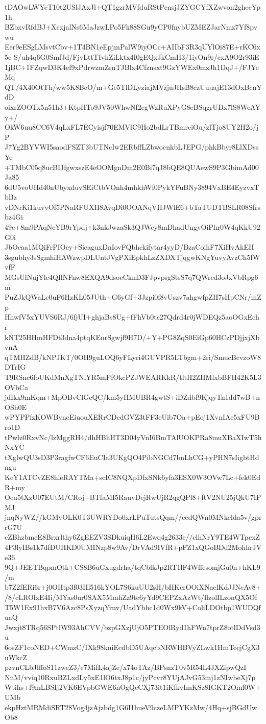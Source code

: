 tDAOwLWYcT10t2USlJAxJl+QT1gzrMVfduRStPcnsjJZYGCYfXZwvon2gheeYp1h
BZbxvRfdBJ+XcxjalNs6MaJzwLPo5Fk88SGu9yCP0fnybUZMEZJarNmz7Yf8pvwu
Eer9eESgLMsvtCbv+1T4BN1eEpjmPalW9iyOCc+AIIbF3R3qUYlOi87E+rKC6x5e
S/uh4q6G0SmfJd/FjvLttTIvhZiLktx4I0gEQxJkCmH3/1iyOn9r/cxA9O2r93iE
1jBC+1FZqwD3K4ef9xPdrwzmZrnTJBlx4Cfznsxt9GzYWEx0mzJh1DqJ+/FJYeMq
QT/4X40OtTh/ww5K8BcO/m+Ge5TlDLyziajMVzjuJHsB8czUuuajE13dOxBcnYdD
oixrZOOTx5n51h3+KtpHTo9JV50WhwNf2egWzRuXPyG8eBSqgrUDx7lS8WcAYy+/
OkW6uu8CC6V4qLxFL7ECyisjf70EMVlC9Ho2bdLrTBmreiOu/zlTjo8UY2H2o/jP
J7Yg2BYVWI5saodFSZT3bUTNcIw2ERbffLZbwocnkbLJEPG/phkBbyr8LlXDssYe
+TMbC05q8ucBIJfgwxszE4eOOMgnDm2E0Bi7qJ8bQE8QUAewS9P3GbimAd00Ja85
6dU5voUHd40nUbyxduvSEiCtbVOnh4mhkhWf0PykYFuBNy3894VxBE4EyzvxTbBz
vDNrKi1kuvvOf5PNaRFUXH8AvqDi0OOANqVHJWlE6+bTaTUDTBSLR08Sfrsbz4Gi
49e+8m9PAqNcYB9rYpdj+k3nkJwzaSk3QJWcy8mDhadUngyOiPhr0W4qKkU92G0i
JbOeaa1MQiFrPIOey+SieaguxDnIovFQbhckifytar4yyD/BzaCoihF7XiHvAkEH
3sgubhy3sSgmhiHAWzwpDLUntJVgPXiEpkhLzZXDXTjqgwKNgYuvyAvzCh5fWvfF
MGsUlNujYlc4QIlNFnw8EXQA9dsocCknD3FJpvpsgStsS7q7QWrcd3oJxVbRpg6m
PuZJkQWaLe0uF6HzKL05JUth+G6yGf+3Jzpi0f8vUszv7ahgwfpZH7sHpCNr/mZp
HhwfV5xYUVS6RJ/6fjUI+ghjaBs8Ug+fFhVb0tc27Qdrd4r0jWDEQz5aoOGxEchr
kNT25HHmHFDt3dna4ptqKEnrSgwjf9H7D/+Y+PG8ZqS0EiGp60HCzPDjjxjXbvnA
qTMHZdB/kNPJKT/0OH9guLOQ6yFLyri4GUVPR5LTbgm+2ri/SmucBcvzoW8DTrIG
T9RSnc6foUKdMnXgTNlYR5mPfOkcPZJWEARKkR/tltH2ZHMlxbBFH42K5L3OVbCa
jdIkx9mKqm+MpOBvClGcQC/km5yHMUBR4gwtS+iDZdbf9KjqyTn1dd7wB+nOSh0E
wPYPPfzKOWByncEiuouXERrCDcdGVZ3tFF3eUib7Oa+pEoj1XvnIAe5xFU9Bro1D
tPwlz0RxvNc/lzMggRH4/dhHBhHT3D04yVnI6BmTAlUOKPRa8muXBaXIwT5hNxYC
tXglwQU3sD3P3ragfwCF6EuCIa3UKgQO4PibNGCd7bnLhCG+yPHN7sIigbtHdngu
KeY1ATCvZE8hleRAYTMa+scIC8NQXpDfxSNk6yfa3ESX0W3OVw7Lc+fek0EdR+my
Oeu5tXzU07EUtM/CRoj+BTfaMI5RauvDejRwUjR2qgQPl8+ftV2NU25jQkU7IPMJ
jnqNyWZ//kGMvOLK0T3UWRYDo0xrLPuTutsQqm//cedQWn0MNkelda5v/gprrG7U
cZBhzbmeE8Brxrlthy6ZgEEZV3SDkuiqH6L2Ewq4g2633e//clhNrY9TE4WTpexZ
4P3lyIBs1k7dfDUHKD0UMINzp8w9Av/DrVAd9IVfR+pFZ1xQGoBDd2MohhrJVe36
9Q+JEETBqpmOtk+CS8B6uGxugdrha/tqCblkJp2RT1lF4WffesomjGu0n+hKL9/m
b7Z2fERi6r+j0OHtp3f03Hl516kYOL7S6kuUU2sH/bHKcrOOiXNaelKdJJNeAv8+
/8/cLROlxE4Ii/MYas0ur0SAX5MmhZz9te6yYd9CEPZxAzWt/flzolILzonQX5Of
T5W1Ex91hxB7V6Azc8PsXyzqYrnv/UadYbhc1d0Wx9kV+ColiLDOtbp1WUDQfuaQ
Jwxjt8TRq56SPtlW93AhCVV/bzpGXzjUjO5PTEOlRyd1hFWn7tprZ8otlDdVsd3u
6osZF1coNED+CWmzC/IXk98kniEcdbD5UAqcbNRWHBVyZLwk1HmTeejCgX3uWkcZ
pzvnCLbJlffoS11zweZ3/c7MifL4ajZe/x74oTAz/BPsnzT0v5R54L4JXZipwQzI
NnM/vviq10RxuBZLxdLy5xE1lO6txJ8p1c/jyPcvr8YUjAJvG53mj1zNIwbeXj7p
Wtihs+f9mLBSIj2VK6EVpbGWE6nOgQcCXj73it1iKfkvImKSz8IGKT2Omf0W+UMb
ekpHztMRMdiSRT28Vog4jzAjzbdg1G6I1hueV9czeLMPYKzMw/4Hq+sjBGdUwOb8
